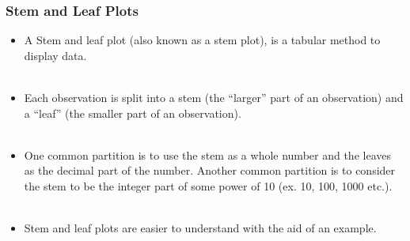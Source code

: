 \documentclass[xcolor=svgnames, compress]{beamer}
\begin{document}
\begin{frame}
\frametitle{Stem and Leaf Plots}

\begin{itemize}
\justifying
\item	A \alert{Stem and leaf} plot (also known as a \alert{stem plot}), is a tabular method to display data.\\
\hfill\\
\item	Each observation is split into a stem (the ``larger'' part of an observation) and a ``leaf'' (the smaller part of an observation).\\
\hfill\\
\item	One common partition is to use the stem as a whole number and the leaves as the decimal part of the number.
	Another common partition is to consider the stem to be the integer part of some power of 10 (ex. 10, 100, 1000 etc.).\\
\hfill\\
\item	Stem and leaf plots are easier to understand with the aid of an example.
\end{itemize}

\end{frame}




\end{document}
